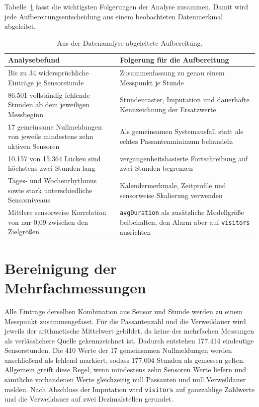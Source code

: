 Tabelle~\ref{tab:analyse_preprocessing} fasst die wichtigsten Folgerungen der
Analyse zusammen. Damit wird jede Aufbereitungsentscheidung aus einem
beobachteten Datenmerkmal abgeleitet.

\begin{table}[htb]
  \centering
  \small
  \caption{Aus der Datenanalyse abgeleitete Aufbereitung.}
  \label{tab:analyse_preprocessing}
  \begin{tabularx}{\textwidth}{p{}X}
    \hline
    Analysebefund & Folgerung für die Aufbereitung \\
    \hline
    Bis zu 34 widersprüchliche Einträge je Sensorstunde &
      Zusammenfassung zu genau einem Messpunkt je Stunde \\
    86.501 vollständig fehlende Stunden ab dem jeweiligen Messbeginn &
      Stundenraster, Imputation und dauerhafte Kennzeichnung der Ersatzwerte \\
    17 gemeinsame Nullmeldungen von jeweils mindestens zehn aktiven Sensoren &
      Als gemeinsamen Systemausfall statt als echtes Passantenminimum behandeln \\
    10.157 von 15.364 Lücken sind höchstens zwei Stunden lang &
      vergangenheitsbasierte Fortschreibung auf zwei Stunden begrenzen \\
    Tages- und Wochenrhythmus sowie stark unterschiedliche Sensorniveaus &
      Kalendermerkmale, Zeitprofile und sensorweise Skalierung verwenden \\
    Mittlere sensorweise Korrelation von nur 0{,}09 zwischen den Zielgrößen &
      \texttt{avgDuration} als zusätzliche Modellgröße beibehalten, den Alarm
      aber auf \texttt{visitors} ausrichten \\
    \hline
  \end{tabularx}
\end{table}

\section{Bereinigung der Mehrfachmessungen}
\label{sec:Methode_Dedup}

Alle Einträge derselben Kombination aus Sensor und Stunde werden zu einem
Messpunkt zusammengefasst. Für die Passantenzahl und die Verweildauer wird
jeweils der arithmetische Mittelwert gebildet, da keine der mehrfachen
Messungen als verlässlichere Quelle gekennzeichnet ist. Dadurch entstehen
177.414 eindeutige Sensorstunden. Die 410 Werte der 17 gemeinsamen
Nullmeldungen werden anschließend als fehlend markiert, sodass 177.004 Stunden
als gemessen gelten.
Allgemein greift diese Regel, wenn mindestens zehn Sensoren Werte liefern und
sämtliche vorhandenen Werte gleichzeitig null Passanten und null Verweildauer
melden.
Nach Abschluss der Imputation wird \texttt{visitors} auf ganzzahlige Zählwerte
und die Verweildauer auf zwei Dezimalstellen gerundet.

